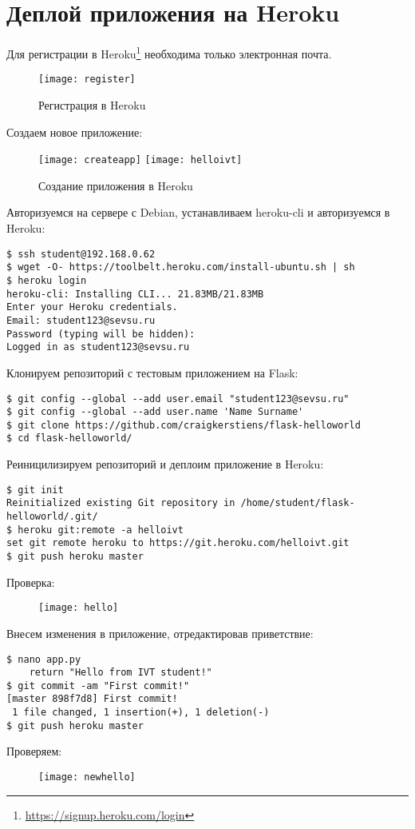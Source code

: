\section{Деплой приложения на Heroku} \label{pril:e}

Для регистрации в Heroku\footnote{\url{https://signup.heroku.com/login}} необходима только электронная почта.
\begin{figure}[ht]
    \centering
	\texttt{[image: register]}
    \caption{Регистрация в Heroku}
\end{figure}

Создаем новое приложение:
\begin{figure}[ht]
    \centering
    \texttt{[image: createapp]}
	\texttt{[image: helloivt]}
    \caption{Создание приложения в Heroku}
\end{figure}

Авторизуемся на сервере с Debian, устанавливаем heroku-cli и авторизуемся в Heroku:
\begin{lstlisting}
$ ssh student@192.168.0.62
$ wget -O- https://toolbelt.heroku.com/install-ubuntu.sh | sh
$ heroku login
heroku-cli: Installing CLI... 21.83MB/21.83MB
Enter your Heroku credentials.
Email: student123@sevsu.ru
Password (typing will be hidden):
Logged in as student123@sevsu.ru
\end{lstlisting}

Клонируем репозиторий с тестовым приложением на Flask:
\begin{lstlisting}
$ git config --global --add user.email "student123@sevsu.ru"
$ git config --global --add user.name 'Name Surname'
$ git clone https://github.com/craigkerstiens/flask-helloworld
$ cd flask-helloworld/
\end{lstlisting}

Реиницилизируем репозиторий и деплоим приложение в Heroku:
\begin{lstlisting}
$ git init
Reinitialized existing Git repository in /home/student/flask-helloworld/.git/
$ heroku git:remote -a helloivt
set git remote heroku to https://git.heroku.com/helloivt.git
$ git push heroku master
\end{lstlisting}

Проверка:
\begin{figure}[ht]
    \centering
	\texttt{[image: hello]}
\end{figure}

Внесем изменения в приложение, отредактировав приветствие:
\begin{lstlisting}
$ nano app.py
    return "Hello from IVT student!"
$ git commit -am "First commit!"
[master 898f7d8] First commit!
 1 file changed, 1 insertion(+), 1 deletion(-)
$ git push heroku master
\end{lstlisting}

Проверяем:
\begin{figure}[ht]
    \centering
	\texttt{[image: newhello]}
\end{figure}

\clearpage
